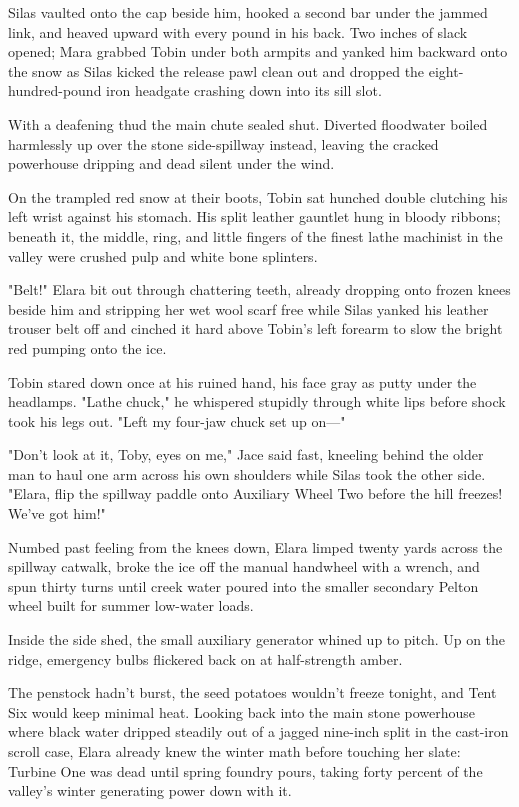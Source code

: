 Silas vaulted onto the cap beside him, hooked a second bar under the jammed link, and heaved upward with every pound in his back. Two inches of slack opened; Mara grabbed Tobin under both armpits and yanked him backward onto the snow as Silas kicked the release pawl clean out and dropped the eight-hundred-pound iron headgate crashing down into its sill slot.

With a deafening thud the main chute sealed shut. Diverted floodwater boiled harmlessly up over the stone side-spillway instead, leaving the cracked powerhouse dripping and dead silent under the wind.

On the trampled red snow at their boots, Tobin sat hunched double clutching his left wrist against his stomach. His split leather gauntlet hung in bloody ribbons; beneath it, the middle, ring, and little fingers of the finest lathe machinist in the valley were crushed pulp and white bone splinters.

"Belt!" Elara bit out through chattering teeth, already dropping onto frozen knees beside him and stripping her wet wool scarf free while Silas yanked his leather trouser belt off and cinched it hard above Tobin's left forearm to slow the bright red pumping onto the ice.

Tobin stared down once at his ruined hand, his face gray as putty under the headlamps. "Lathe chuck," he whispered stupidly through white lips before shock took his legs out. "Left my four-jaw chuck set up on—"

"Don't look at it, Toby, eyes on me," Jace said fast, kneeling behind the older man to haul one arm across his own shoulders while Silas took the other side. "Elara, flip the spillway paddle onto Auxiliary Wheel Two before the hill freezes! We've got him!"

Numbed past feeling from the knees down, Elara limped twenty yards across the spillway catwalk, broke the ice off the manual handwheel with a wrench, and spun thirty turns until creek water poured into the smaller secondary Pelton wheel built for summer low-water loads.

Inside the side shed, the small auxiliary generator whined up to pitch. Up on the ridge, emergency bulbs flickered back on at half-strength amber.

The penstock hadn't burst, the seed potatoes wouldn't freeze tonight, and Tent Six would keep minimal heat. Looking back into the main stone powerhouse where black water dripped steadily out of a jagged nine-inch split in the cast-iron scroll case, Elara already knew the winter math before touching her slate: Turbine One was dead until spring foundry pours, taking forty percent of the valley's winter generating power down with it.

